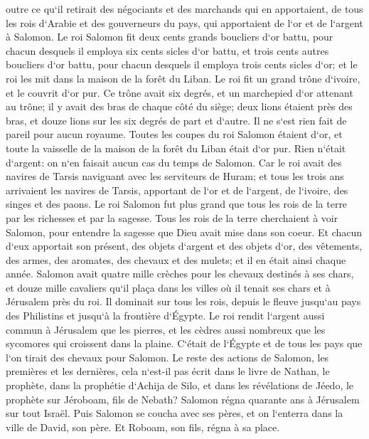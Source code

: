 \verse outre ce qu`il retirait des négociants et des marchands qui en apportaient, de tous les rois d`Arabie et des gouverneurs du pays, qui apportaient de l`or et de l`argent à Salomon. 
\verse Le roi Salomon fit deux cents grands boucliers d`or battu, pour chacun desquels il employa six cents sicles d`or battu, 
\verse et trois cents autres boucliers d`or battu, pour chacun desquels il employa trois cents sicles d`or; et le roi les mit dans la maison de la forêt du Liban. 
\verse Le roi fit un grand trône d`ivoire, et le couvrit d`or pur. 
\verse Ce trône avait six degrés, et un marchepied d`or attenant au trône; il y avait des bras de chaque côté du siège; deux lions étaient près des bras, 
\verse et douze lions sur les six degrés de part et d`autre. Il ne s`est rien fait de pareil pour aucun royaume. 
\verse Toutes les coupes du roi Salomon étaient d`or, et toute la vaisselle de la maison de la forêt du Liban était d`or pur. Rien n`était d`argent: on n`en faisait aucun cas du temps de Salomon. 
\verse Car le roi avait des navires de Tarsis naviguant avec les serviteurs de Huram; et tous les trois ans arrivaient les navires de Tarsis, apportant de l`or et de l`argent, de l`ivoire, des singes et des paons. 
\verse Le roi Salomon fut plus grand que tous les rois de la terre par les richesses et par la sagesse. 
\verse Tous les rois de la terre cherchaient à voir Salomon, pour entendre la sagesse que Dieu avait mise dans son coeur. 
\verse Et chacun d`eux apportait son présent, des objets d`argent et des objets d`or, des vêtements, des armes, des aromates, des chevaux et des mulets; et il en était ainsi chaque année. 
\verse Salomon avait quatre mille crèches pour les chevaux destinés à ses chars, et douze mille cavaliers qu`il plaça dans les villes où il tenait ses chars et à Jérusalem près du roi. 
\verse Il dominait sur tous les rois, depuis le fleuve jusqu`au pays des Philistins et jusqu`à la frontière d`Égypte. 
\verse Le roi rendit l`argent aussi commun à Jérusalem que les pierres, et les cèdres aussi nombreux que les sycomores qui croissent dans la plaine. 
\verse C`était de l`Égypte et de tous les pays que l`on tirait des chevaux pour Salomon. 
\verse Le reste des actions de Salomon, les premières et les dernières, cela n`est-il pas écrit dans le livre de Nathan, le prophète, dans la prophétie d`Achija de Silo, et dans les révélations de Jéedo, le prophète sur Jéroboam, fils de Nebath? 
\verse Salomon régna quarante ans à Jérusalem sur tout Israël. 
\verse Puis Salomon se coucha avec ses pères, et on l`enterra dans la ville de David, son père. Et Roboam, son fils, régna à sa place. 

